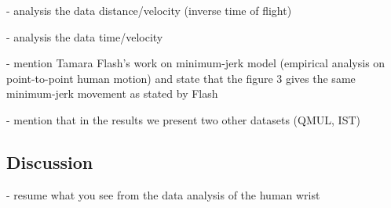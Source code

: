 - analysis the data distance/velocity (inverse time of flight)

- analysis the data time/velocity

- mention Tamara Flash's work on minimum-jerk model (empirical analysis on point-to-point human motion) and state that the figure 3 gives the same minimum-jerk movement as stated by Flash

- mention that in the results we present two other datasets (QMUL, IST)

\subsection{Discussion}

- resume what you see from the data analysis of the human wrist

